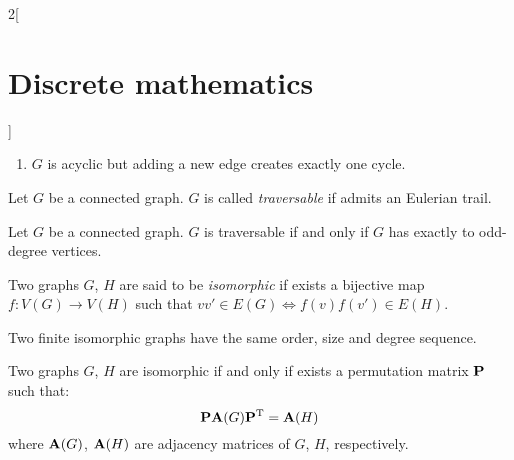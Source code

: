 \documentclass[../../../main.tex]{subfiles}
\begin{document}
\begin{multicols}{2}[\section{Discrete mathematics}]
\begin{prop}
\begin{enumerate}
      \item $G$ is acyclic but adding a new edge creates exactly one cycle.
    \end{enumerate}
  \end{prop}
  \begin{definition}
    Let $G$ be a connected graph. $G$ is called \emph{traversable} if admits an Eulerian trail.
  \end{definition}
  \begin{theorem}
    Let $G$ be a connected graph. $G$ is traversable if and only if $G$ has exactly to odd-degree vertices.
  \end{theorem}
  \begin{definition}
    Two graphs $G$, $H$ are said to be \emph{isomorphic} if exists a bijective map $f:V(G)\rightarrow V(H)$ such that $vv'\in E(G)\iff f(v)f(v')\in E(H)$.
  \end{definition}
  \begin{prop}
    Two finite isomorphic graphs have the same order, size and degree sequence.
  \end{prop}
  \begin{theorem}
    Two graphs $G$, $H$ are isomorphic if and only if exists a permutation matrix $\boldsymbol{\mathrm{P}}$ such that: $$\boldsymbol{\mathrm{P}}\boldsymbol{\mathrm{A}}(G)\vb{P}^{\mathrm{T}}=\boldsymbol{\mathrm{A}}(H)$$ where $\boldsymbol{\mathrm{A}}(G)$, $\boldsymbol{\mathrm{A}}(H)$ are adjacency matrices of $G$, $H$, respectively.
  \end{theorem}

\end{multicols}
\end{document}
